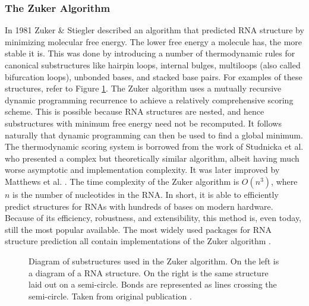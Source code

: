 \documentclass[12pt, a4paper]{article}
\begin{document}
\subsubsection{The Zuker Algorithm}
In 1981 Zuker \& Stiegler \cite{zuker1981optimal}
described an algorithm that predicted RNA structure by minimizing molecular free energy. The lower free energy a molecule has, the more stable it is. This was done
by introducing a number of thermodynamic rules for canonical substructures like hairpin loops, internal bulges, multiloops (also called bifurcation loops), unbonded bases, and stacked base pairs. For examples of these structures, refer to Figure \ref{fig:zuk_struct}. The Zuker algorithm uses a mutually recursive dynamic programming recurrence to achieve a relatively comprehensive scoring scheme. This is possible because RNA structures are nested, and hence substructures with minimum free energy need not be recomputed. It follows naturally that dynamic programming can then be used to find a global minimum. The thermodynamic scoring system is borrowed from the work of Studnicka et al. \cite{studnicka1978computer} who presented a
complex but theoretically similar algorithm, albeit having
much worse asymptotic and implementation complexity. It was later improved by Matthews et al. \cite{mathews1999expanded, mathews2004incorporating}. The time complexity of the Zuker algorithm is $O(n^3)$, where $n$ is the number of nucleotides in the RNA. In short, it is able to efficiently predict structures for RNAs with hundreds of bases on modern hardware.  Because of
its efficiency, robustness, and extensibility, this method is,
even today, still the most popular available. The most widely used packages for RNA structure prediction all contain implementations of the Zuker algorithm \cite{lorenz2011viennarna, reuter2010rnastructure}.

\begin{figure}
\begin{center}
\end{center}
\caption{Diagram of substructures used in the Zuker algorithm. On the left is a diagram of a RNA structure. On the right is the same structure laid out on a semi-circle. Bonds are represented as lines crossing the semi-circle. Taken from original
publication \cite{zuker1981optimal}.}
\label{fig:zuk_struct}
\end{figure}
\end{document}
